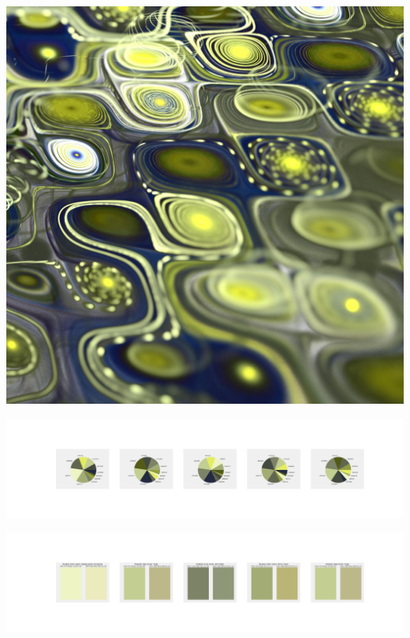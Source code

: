 \documentclass[11pt]{article}
\begin{document}
\begin{landscape}
    \begin{center}
    \includegraphics[width=\textwidth]{./nbimg/file (343).jpg}
    \end{center}

    \begin{center}
    \includegraphics[width=250mm]{./nbimg/pie-271.jpg}
    \end{center}

    \begin{center}
    \includegraphics[width=250mm]{./nbimg/peak-271.jpg}
    \end{center}
    


\end{landscape}
\end{document}
